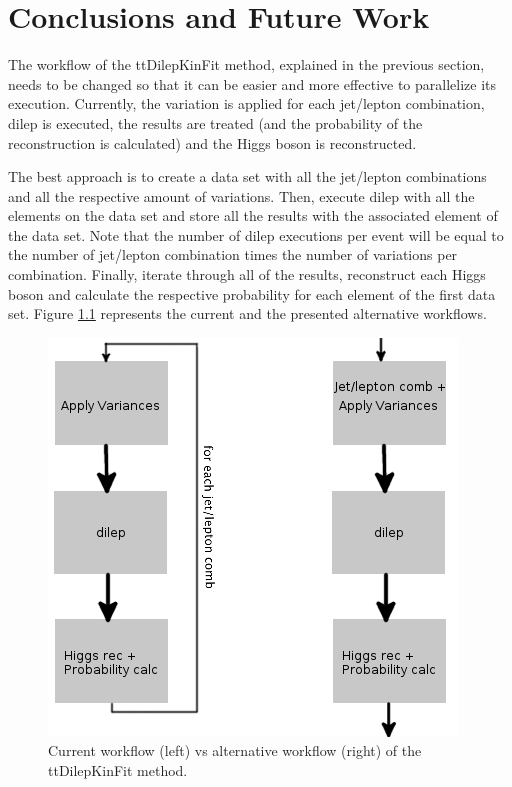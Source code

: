 
\chapter{Conclusions and Future Work}

The workflow of the ttDilepKinFit method, explained in the previous section, needs to be changed so that it can be easier and more effective to parallelize its execution. Currently, the variation is applied for each jet/lepton combination, dilep is executed, the results are treated (and the probability of the reconstruction is calculated) and the Higgs boson is reconstructed.

The best approach is to create a data set with all the jet/lepton combinations and all the respective amount of variations. Then, execute dilep with all the elements on the data set and store all the results with the associated element of the data set. Note that the number of dilep executions per event will be equal to the number of jet/lepton combination times the number of variations per combination.  Finally, iterate through all of the results, reconstruct each Higgs boson and calculate the respective probability for each element of the first data set. Figure \ref{fig:pipeline} represents the current and the presented alternative workflows.

\begin{figure}[!htp]
	\begin{center}
		\includegraphics[scale=0.5]{../../common/img/pipeline.png}
		\caption{Current workflow (left) vs alternative workflow (right) of the ttDilepKinFit method.}
		\label{fig:pipeline}
	\end{center}
\end{figure}

